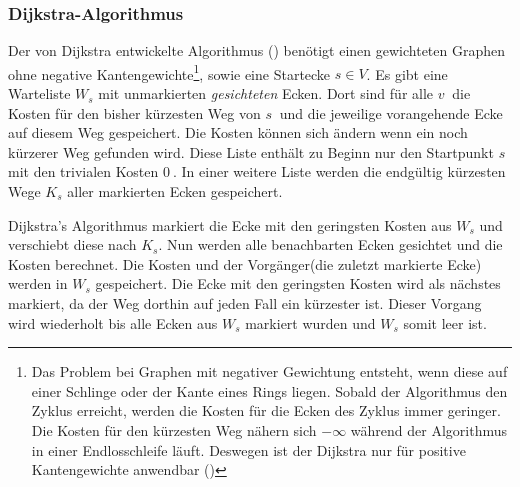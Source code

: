\subsubsection{Dijkstra-Algorithmus}
\label{sec:dijkstra}
Der von Dijkstra entwickelte Algorithmus (\cite{dijkstra}) benötigt einen gewichteten Graphen ohne negative Kantengewichte\footnote{Das Problem bei Graphen mit negativer Gewichtung entsteht, wenn diese auf einer Schlinge oder der Kante eines Rings liegen.
Sobald der Algorithmus den Zyklus erreicht, werden die Kosten für die Ecken des Zyklus immer geringer.
Die Kosten für den kürzesten Weg nähern sich $-\infty $ während der Algorithmus in einer Endlosschleife läuft.
Deswegen ist der Dijkstra nur für positive Kantengewichte anwendbar (\cite[194\psq]{kurt})}, sowie eine Startecke $s \in V$.
Es gibt eine Warteliste $W_{s}$ mit unmarkierten \textit{gesichteten} Ecken.
Dort sind für alle $v~$ die Kosten für den bisher kürzesten Weg von $s~$ und die jeweilige vorangehende Ecke auf diesem Weg gespeichert.
Die Kosten können sich ändern wenn ein noch kürzerer Weg gefunden wird.
Diese Liste enthält zu Beginn nur den Startpunkt $s~$ mit den trivialen Kosten $0~$.
In einer weitere Liste werden die endgültig kürzesten Wege $K_{s}$ aller markierten Ecken gespeichert.

Dijkstra's Algorithmus markiert die Ecke mit den geringsten Kosten aus $W_{s}$ und verschiebt diese nach $K_{s}$.
Nun werden alle benachbarten Ecken gesichtet und die Kosten berechnet.
Die Kosten und der Vorgänger(die zuletzt markierte Ecke) werden in $W_{s}$ gespeichert.
Die Ecke mit den geringsten Kosten wird als nächstes markiert, da der Weg dorthin auf jeden Fall ein kürzester ist.
Dieser Vorgang wird wiederholt bis alle Ecken aus $W_{s}$ markiert wurden und $W_{s}$ somit leer ist.

